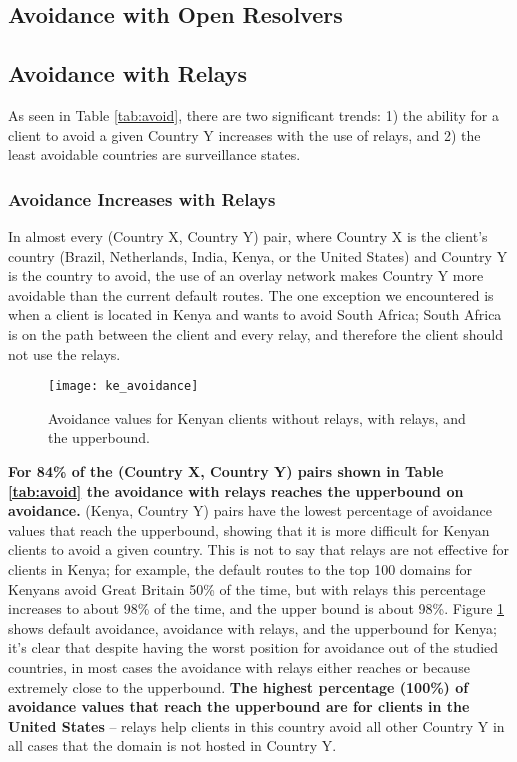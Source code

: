 \subsection{Avoidance with Open Resolvers}

\subsection{Avoidance with Relays}
As seen in Table \ref{tab:avoid}, there are two significant trends: 1) the ability for a client to avoid a given Country Y increases with the use of relays, and 2) the least avoidable countries are surveillance states.

\subsubsection{Avoidance Increases with Relays}
In almost every (Country X, Country Y) pair, where Country X is the client's country (Brazil, Netherlands, India, Kenya, or the United States) and Country Y is the country to avoid, the use of an overlay network makes Country Y more avoidable than the current default routes.  The one exception we encountered is when a client is located in Kenya and wants to avoid South Africa; South Africa is on the path between the client and every relay, and therefore the client should not use the relays.  

\begin{figure}
\centering
\texttt{[image: ke\_avoidance]}
\caption{Avoidance values for Kenyan clients without relays, with relays, and the upperbound.}
\label{fig:ke_avoidance}
\end{figure}

{\bf For 84\% of the (Country X, Country Y) pairs shown in Table \ref{tab:avoid} the avoidance with relays reaches the upperbound on avoidance.}  (Kenya, Country Y) pairs have the lowest percentage of avoidance values that reach the upperbound, showing that it is more difficult for Kenyan clients to avoid a given country.  This is not to say that relays are not effective for clients in Kenya; for example, the default routes to the top 100 domains for Kenyans avoid Great Britain 50\% of the time, but with relays this percentage increases to about 98\% of the time, and the upper bound is about 98\%. Figure \ref{fig:ke_avoidance} shows default avoidance, avoidance with relays, and the upperbound for Kenya; it's clear that despite having the worst position for avoidance out of the studied countries, in most cases the avoidance with relays either reaches or because extremely close to the upperbound.  {\bf The highest percentage (100\%) of avoidance values that reach the upperbound are for clients in the United States} -- relays help clients in this country avoid all other Country Y in all cases that the domain is not hosted in Country Y.  

